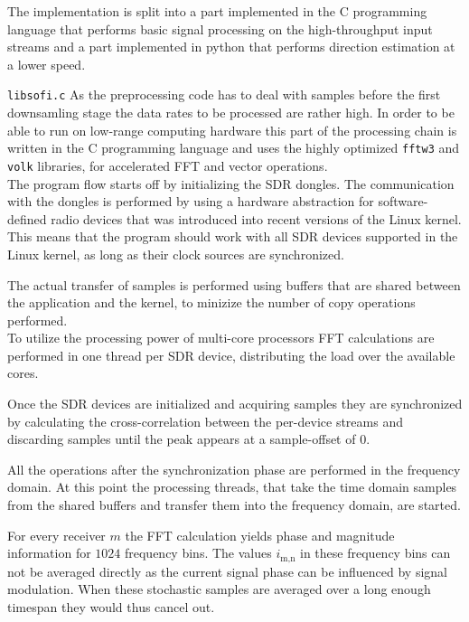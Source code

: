 The implementation is split into a part implemented in
the C programming language that performs basic signal
processing on the high-throughput input streams and
a part implemented in python that performs direction estimation
at a lower speed.

\begin{subchapter}{\texttt{libsofi.c}}
  As the preprocessing code has to deal with samples
  before the first downsamling stage the data rates to be
  processed are rather high.
  In order to be able to run on low-range computing hardware
  this part of the processing chain is written in the C
  programming language and
  uses the highly optimized \texttt{fftw3} and \texttt{volk}
  libraries, for accelerated FFT and vector operations. \\

  The program flow starts off by initializing the SDR
  dongles. The communication with the dongles is performed
  by using a hardware abstraction for software-defined radio
  devices that was introduced into recent versions of
  the Linux kernel. This means that the program should work
  with all SDR devices supported in the Linux kernel,
  as long as their clock sources are synchronized.

  The actual transfer of samples is performed using
  buffers that are shared between the application and
  the kernel, to minizize the number of copy operations performed. \\

  To utilize the processing power of multi-core processors
  FFT calculations are performed in one thread per
  SDR device, distributing the load over the available cores.

  Once the SDR devices are initialized and acquiring samples
  they are synchronized by calculating the
  cross-correlation between the per-device streams
  and discarding samples until the peak appears at a
  sample-offset of $0$.

  All the operations after the synchronization phase are
  performed in the frequency domain.
  At this point the processing threads, that
  take the time domain samples from the shared buffers and transfer
  them into the frequency domain, are started.

  For every receiver $m$ the FFT calculation yields phase
  and magnitude information for $1024$ frequency bins.
  The values $i_\text{m,n}$ in these frequency bins can not
  be averaged directly as the current signal phase can be
  influenced by signal modulation. When these stochastic samples
  are averaged over a long enough timespan they would thus cancel out. \\


\end{subchapter}
